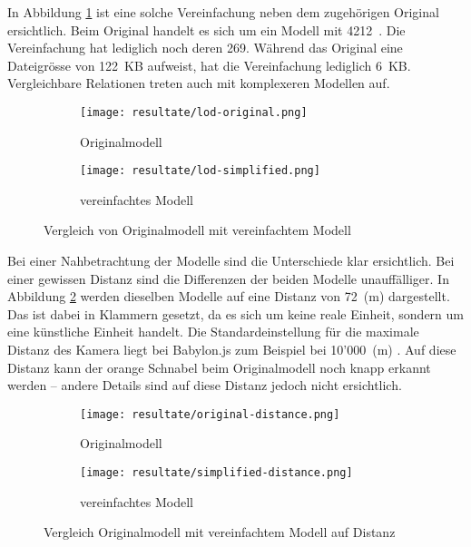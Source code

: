 In Abbildung \ref{fig:lodComparison} ist eine solche Vereinfachung neben dem zugehörigen Original ersichtlich. Beim Original handelt es sich um ein Modell mit 4212 . Die Vereinfachung hat lediglich noch deren 269. Während das Original eine Dateigrösse von 122 KB aufweist, hat die Vereinfachung lediglich 6 KB. Vergleichbare Relationen treten auch mit komplexeren Modellen auf.

\begin{figure}[H]
  \centering
  \begin{subfigure}{.4\textwidth}
    \centering
    \texttt{[image: resultate/lod-original.png]}
    \caption{Originalmodell}
  \end{subfigure}
  \begin{subfigure}{.4\textwidth}
    \centering
    \texttt{[image: resultate/lod-simplified.png]}
    \caption{vereinfachtes Modell}
  \end{subfigure}
  \caption{Vergleich von Originalmodell mit vereinfachtem Modell}
  \label{fig:lodComparison}
\end{figure}

Bei einer Nahbetrachtung der Modelle sind die Unterschiede klar ersichtlich. Bei einer gewissen Distanz sind die Differenzen der beiden Modelle unauffälliger. In Abbildung \ref{fig:lodComparisonDistance} werden dieselben Modelle auf eine Distanz von 72 (m) dargestellt. Das  ist dabei in Klammern gesetzt, da es sich um keine reale Einheit, sondern um eine künstliche Einheit handelt. Die Standardeinstellung für die maximale Distanz des Kamera  liegt bei Babylon.js zum Beispiel bei 10'000 (m) \cite{babylonMaxZ}. Auf diese Distanz kann der orange Schnabel beim Originalmodell noch knapp erkannt werden – andere Details sind auf diese Distanz jedoch nicht ersichtlich.

\begin{figure}[H]
  \centering
  \begin{subfigure}{.4\textwidth}
    \centering
    \texttt{[image: resultate/original-distance.png]}
    \caption{Originalmodell}
  \end{subfigure}
  \begin{subfigure}{.4\textwidth}
    \centering
    \texttt{[image: resultate/simplified-distance.png]}
    \caption{vereinfachtes Modell}
  \end{subfigure}
  \caption{Vergleich Originalmodell mit vereinfachtem Modell auf Distanz}
  \label{fig:lodComparisonDistance}
\end{figure}

